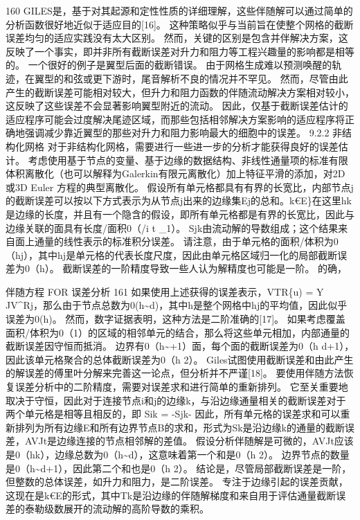 \documentclass[UTF8,11pt,a4paper,openany,fontset=fandol]{ctexbook}
\begin{document}
160 GILES是，基于对其起源和定性性质的详细理解，这些伴随解可以通过简单的分析函数很好地近似于适应目的[16]。 这种策略似乎与当前旨在使整个网格的截断误差均匀的适应实践没有太大区别。 然而，关键的区别是包含并伴解决方案，这反映了一个事实，即并非所有截断误差对升力和阻力等工程兴趣量的影响都是相等的。 一个很好的例子是翼型后面的截断错误。 由于网格生成难以预测唤醒的轨迹，在翼型的和弦或更下游时，尾音解析不良的情况并不罕见。 然而，尽管由此产生的截断误差可能相对较大，但升力和阻力函数的伴随流动解决方案相对较小，这反映了这些误差不会显著影响翼型附近的流动。 因此，仅基于截断误差估计的适应程序可能会过度解决尾迹区域，而那些包括相邻解决方案影响的适应程序将正确地强调减少靠近翼型的那些对升力和阻力影响最大的细胞中的误差。 9.2.2 非结构化网格 对于非结构化网格，需要进行一些进一步的分析才能获得良好的误差估计。 考虑使用基于节点的变量、基于边缘的数据结构、非线性通量项的标准有限体积离散化（也可以解释为Galerkin有限元离散化）加上特征平滑的添加，对2D或3D Euler 方程的典型离散化。 假设所有单元格都具有有界的长宽比，内部节点j的截断误差可以按以下方式表示为从节点j出来的边缘集Ej的总和。k€E\}在这里hk是边缘的长度，并且有一个隐含的假设，即所有单元格都是有界的长宽比，因此与边缘关联的面具有长度/面积0（/i t \_1）。 Sjk由流动解的导数组成；这个结果来自面上通量的线性表示的标准积分误差。 请注意，由于单元格的面积/体积为0（hj），其中hj是单元格的代表长度尺度，因此由单元格区域归一化的局部截断误差为0（h）。 截断误差的一阶精度导致一些人认为解精度也可能是一阶。 的确，

伴随方程 FOR 误差分析 161 如果使用上述获得的误差表示，VTR\{u) = Y JV\textasciicircum{}Rj，那么由于节点总数为0(h\textasciitilde{}d)，其中h是整个网格中hj的平均值，因此似乎误差为0(h)。 然而，数字证据表明，这种方法是二阶准确的[17]。 如果考虑覆盖面积/体积为0（1）的区域的相邻单元的结合，那么将这些单元相加，内部通量的截断误差因守恒而抵消。 边界有0（h\textasciitilde{}+1）面，每个面的截断误差为0（h d+1），因此该单元格聚合的总体截断误差为0（h 2）。 Giles试图使用截断误差和由此产生的解误差的傅里叶分解来完善这一论点，但分析并不严谨[18]。 要使用伴随方法恢复误差分析中的二阶精度，需要对误差求和进行简单的重新排列。 它至关重要地取决于守恒，因此对于连接节点i和j的边缘k，与沿边缘通量相关的截断误差对于两个单元格是相等且相反的，即 Sik = -Sjk- 因此，所有单元格的误差求和可以重新排列为所有边缘E和所有边界节点B的求和，形式为Sk是沿边缘k的通量的截断误差，AVJt是边缘连接的节点相邻解的差值。 假设分析伴随解是可微的，AVJt应该是0（hk），边缘总数为0（h\textasciitilde{}d），这意味着第一个和是0（h 2）。 边界节点的数量是0（h\textasciitilde{}d+1），因此第二个和也是0（h 2）。 结论是，尽管局部截断误差是一阶，但整数的总体误差，如升力和阻力，是二阶误差。 专注于边缘引起的误差贡献，这现在是k€E的形式，其中Tk是沿边缘的伴随解梯度和来自用于评估通量截断误差的泰勒级数展开的流动解的高阶导数的乘积。
\end{document}
